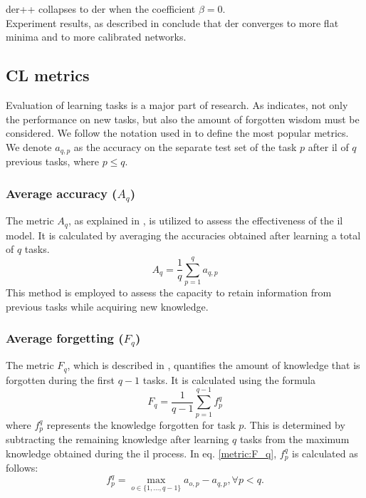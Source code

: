 \acrshort{der++} collapses to \acrshort{der} when the coefficient $\beta=0$. \\
Experiment results, as described in \citep{buzzega2020dark} conclude that \acrshort{der} converges to more flat minima and to more calibrated networks. 

\subsection{CL metrics}
\label{sec:il_metrics}
Evaluation of learning tasks is a major part of research. As \citep{qu2021recent} indicates, not only the performance on new tasks, but also the amount of forgotten wisdom must be considered. We follow the notation used in \citep{diaz2018don, lopez2017gradient, chaudhry2018riemannian} to define the most popular metrics. \\
We denote $a_{q,p}$ as the accuracy on the separate test set of the task $p$ after \acrshort{il} of $q$ previous tasks, where $p\leq q$.

\subsubsection{Average accuracy ($A_{q}$)}
The metric $A_{q}$, as explained in \citep{wang2023comprehensive}, is utilized to assess the effectiveness of the \acrshort{il} model. It is calculated by averaging the accuracies obtained after learning a total of $q$ tasks. 
\begin{equation}
\label{metric:A_q}
    A_{q} = \frac{1}{q} \sum_{p=1}^{q} a_{q,p}
\end{equation}
This method is employed to assess the capacity to retain information from previous tasks while acquiring new knowledge.

\subsubsection{Average forgetting ($F_{q}$)}
The metric $F_{q}$, which is described in \citep{qu2021recent}, quantifies the amount of knowledge that is forgotten during the first $q-1$ tasks. It is calculated using the formula \begin{equation}
\label{metric:F_q}
    F_{q} = \frac{1}{q-1} \sum_{p=1}^{q-1} f_{p}^{q} 
\end{equation} 
where $f_{p}^{q}$ represents the knowledge forgotten for task $p$. This is determined by subtracting the remaining knowledge after learning $q$ tasks from the maximum knowledge obtained during the \acrshort{il} process. In eq. \ref{metric:F_q}, $f_{p}^{q}$ is calculated as follows: 
\begin{equation}
\label{metric:f_p_q}
  f_{p}^{q} = \max_{o \in \{ 1, ..., q-1\}} a_{o,p} - a_{q,p} , \forall p < q.
\end{equation}

